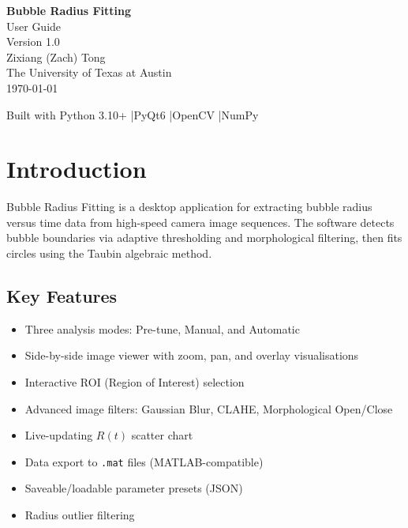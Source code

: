 \documentclass[11pt, letterpaper]{article}
\begin{document}
\begin{titlepage}
\centering
\vspace*{3cm}

{\Huge\bfseries\color{darknavy} Bubble Radius Fitting}\\[0.5cm]
{\LARGE\color{primaryblue} User Guide}\\[2cm]
{\Large Version 1.0}\\[1cm]
{\large Zixiang (Zach) Tong}\\[0.3cm]
{\large The University of Texas at Austin}\\[2cm]
{\large \today}

\vfill
{\small
    Built with Python 3.10+ \quad|\quad PyQt6 \quad|\quad OpenCV \quad|\quad NumPy
}
\end{titlepage}

\tableofcontents
\newpage

\section{Introduction}

Bubble Radius Fitting is a desktop application for extracting bubble radius
versus time data from high-speed camera image sequences. The software detects
bubble boundaries via adaptive thresholding and morphological filtering, then
fits circles using the Taubin algebraic method.

\subsection{Key Features}

\begin{itemize}[leftmargin=1.5em]
    \item Three analysis modes: Pre-tune, Manual, and Automatic
    \item Side-by-side image viewer with zoom, pan, and overlay visualisations
    \item Interactive ROI (Region of Interest) selection
    \item Advanced image filters: Gaussian Blur, CLAHE, Morphological Open/Close
    \item Live-updating $R(t)$ scatter chart
    \item Data export to \texttt{.mat} files (MATLAB-compatible)
    \item Saveable/loadable parameter presets (JSON)
    \item Radius outlier filtering
\end{itemize}
\end{document}
